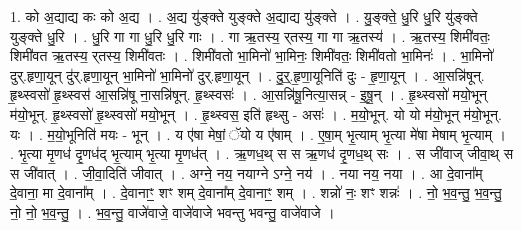 \documentclass[17pt]{extarticle}
\begin{document}
1. को अ॒द्याद्य कः को अ॒द्य । . अ॒द्य यु॑ङ्क्ते युङ्क्ते अ॒द्याद्य यु॑ङ्क्ते । . यु॒ङ्क्ते॒ धु॒रि धु॒रि यु॑ङ्क्ते युङ्क्ते धु॒रि । . धु॒रि गा गा धु॒रि धु॒रि गाः । . गा ऋ॒तस्य॒ र्‌तस्य॒ गा गा ऋ॒तस्य॑ । . ऋ॒तस्य॒ शिमी॑वतः॒ शिमी॑वत ऋ॒तस्य॒ र्‌तस्य॒ शिमी॑वतः । . शिमी॑वतो भा॒मिनो॑ भा॒मिनः॒ शिमी॑वतः॒ शिमी॑वतो भा॒मिनः॑ । . भा॒मिनो॑ दुर्.हृणा॒यून् दु॑र्.हृणा॒यून् भा॒मिनो॑ भा॒मिनो॑ दुर्.हृणा॒यून् । . दु॒र्॒.हृ॒णा॒यूनिति॑ दुः - हृ॒णा॒यून् । . आ॒सन्नि॑षून्. हृ॒थ्स्वसो॑ हृ॒थ्स्वस॑ आ॒सन्नि॑षू ना॒सन्नि॑षून्. हृ॒थ्स्वसः॑ । . आ॒सन्नि॑षू॒नित्या॒सन्न् - इ॒षू॒न् । . हृ॒थ्स्वसो॑ मयो॒भून् म॑यो॒भून्. हृ॒थ्स्वसो॑ हृ॒थ्स्वसो॑ मयो॒भून् । . हृ॒थ्स्वस॒ इति॑ हृथ्सु - असः॑ । . म॒यो॒भून्. यो यो म॑यो॒भून् म॑यो॒भून्. यः । . म॒यो॒भूनिति॑ मयः - भून् । . य ए॑षा मेषां॒ ॅयो य ए॑षाम् । . ए॒षा॒म् भृ॒त्याम् भृ॒त्या मे॑षा मेषाम् भृ॒त्याम् । . भृ॒त्या मृ॒णध॑ दृ॒णध॑द् भृ॒त्याम् भृ॒त्या मृ॒णध॑त् । . ऋ॒णध॒थ् स स ऋ॒णध॑ दृ॒णध॒थ् सः । . स जी॑वाज् जीवा॒थ् स स जी॑वात् । . जी॒वा॒दिति॑ जीवात् । . अग्ने॒ नय॒ नयाग्ने ऽग्ने॒ नय॑ । . नया नय॒ नया । . आ दे॒वाना᳚म् दे॒वाना॒ मा दे॒वाना᳚म् । . दे॒वानाꣳ॒॒ शꣳ शम् दे॒वाना᳚म् दे॒वानाꣳ॒॒ शम् । . शन्नो॑ नः॒ शꣳ शन्नः॑ । . नो॒ भ॒व॒न्तु॒ भ॒व॒न्तु॒ नो॒ नो॒ भ॒व॒न्तु॒ । . भ॒व॒न्तु॒ वाजे॑वाजे॒ वाजे॑वाजे भवन्तु भवन्तु॒ वाजे॑वाजे । \newline
\end{document}
